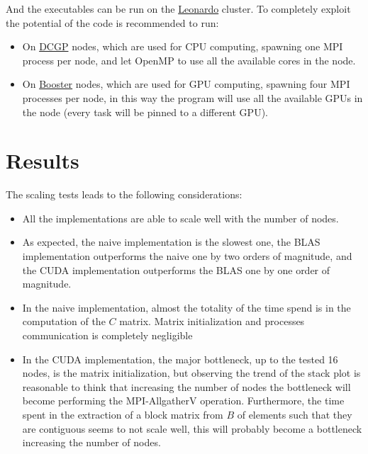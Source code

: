 \documentclass{article}
\begin{document}
    And the executables can be run on the \href{https://leonardo-supercomputer.cineca.eu/}{Leonardo} cluster.
    To completely exploit the potential of the code is recommended to run:
    
    \begin{itemize}
        \itemsep0em
        \item On \href{https://wiki.u-gov.it/confluence/display/SCAIUS/UG3.2.2%3A+LEONARDO+DCGP+UserGuide}{DCGP} nodes, which are used for CPU computing,
             spawning one MPI process per node, and let OpenMP to use all the available cores in the node.
        \item On \href{https://wiki.u-gov.it/confluence/display/SCAIUS/UG3.2.1%3A+LEONARDO+Booster+UserGuide}{Booster} nodes, which are used for GPU computing,
             spawning four MPI processes per node, in this way the program will use all the available GPUs in the node (every task will be pinned to a different GPU).
    \end{itemize}


    \section{Results}

    The scaling tests leads to the following considerations:

    \begin{itemize}
        \itemsep0em
        \item All the implementations are able to scale well with the number of nodes.
        \item As expected, the naive implementation is the slowest one, the BLAS implementation outperforms the naive one by two orders of magnitude,
            and the CUDA implementation outperforms the BLAS one by one order of magnitude.
        \item In the naive implementation, almost the totality of the time spend is in the computation of the $C$ matrix.
            Matrix initialization and processes communication is completely negligible
        \item In the CUDA implementation, the major bottleneck, up to the tested 16 nodes, is the matrix initialization, but observing the
            trend of the stack plot is reasonable to think that increasing the number of nodes the bottleneck will become performing the MPI-AllgatherV operation.
            Furthermore, the time spent in the extraction of a block matrix from $B$ of elements such that they are contiguous seems to not scale well, this will
            probably become a bottleneck increasing the number of nodes.
    \end{itemize}
\end{document}
